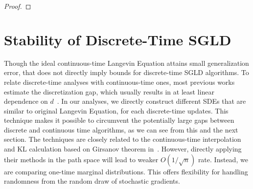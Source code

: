 \documentclass[final,12pt]{colt2018} %
\begin{document}
\begin{proof}
\end{proof}

\section{Stability of Discrete-Time SGLD}
Though the ideal continuous-time Langevin Equation attains small generalization error, that does not directly imply bounds for discrete-time SGLD algorithms. To relate discrete-time analyses with continuous-time ones, most previous works estimate the discretization gap, which usually results in at least linear dependence on $d$~\citep{raginsky2017non}. In our analyses, we directly construct different SDEs that are similar to original Langevin Equation, for each discrete-time updates. This technique makes it possible to circumvent the potentially large gaps between discrete and continuous time algorithms, as we can see from this and the next section. The techniques are closely related to the continuous-time interpolation and KL calculation based on Girsanov theorem in~\citep{dalalyan2017theoretical,raginsky2017non}. However, directly applying their methods in the path space will lead to weaker $O(1/\sqrt{n})$ rate. Instead,  we are comparing one-time marginal distributions. This offers flexibility for handling randomness from the random draw of stochastic gradients.
\end{document}
